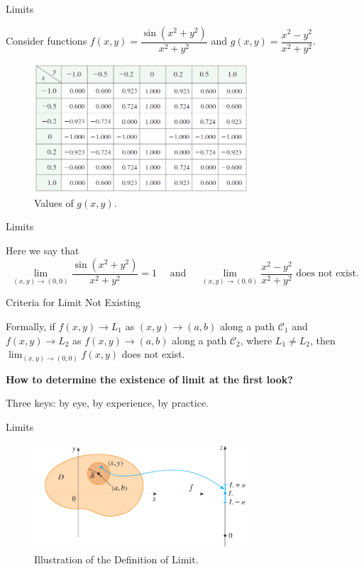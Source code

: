 \documentclass[aspectratio=169, UTF8]{ctexbeamer}
\begin{document}
    \begin{frame}[t]{Limits}
        \par Consider functions $f(x,y) = \dfrac{\sin(x^2+y^2)}{x^2+y^2}$ and $g(x,y) = \dfrac{x^2-y^2}{x^2+y^2}$.
        \begin{figure}
            \centering 
            \includegraphics[width = 8cm]{f6}
            \caption{Values of $g(x,y)$.}
        \end{figure}
    \end{frame}

    \begin{frame}[t]{Limits}
        \par Here we say that 
        \begin{equation*}
            \lim _{(x, y) \rightarrow(0,0)} \frac{\sin \left(x^{2}+y^{2}\right)}{x^{2}+y^{2}}=1 \quad \text { and } \quad \lim _{(x, y) \rightarrow(0,0)} \frac{x^{2}-y^{2}}{x^{2}+y^{2}} \text{ does not exist.}
        \end{equation*}


        \begin{block}{Criteria for Limit Not Existing}
            \par Formally, if $f(x,y) \to L_1$ as $(x,y) \to (a,b)$ along a path $\mathcal{C}_1$ and $f(x,y) \to L_2$ as $f(x,y) \to (a,b)$ along a path $\mathcal{C}_2$, where $L_1 \neq L_2$, then $\lim_{(x, y) \rightarrow(0,0)} f(x,y)$ does not exist.
        \end{block}


        \par \textbf{How to determine the existence of limit at the first look?}
        \par Three keys: by eye, by experience, by practice.  
    \end{frame}

    \begin{frame}[t]{Limits}
        \begin{figure}
            \centering 
            \includegraphics[width = 8cm]{f7}
            \caption{Illustration of the Definition of Limit.}
        \end{figure}
    \end{frame}
\end{document}
